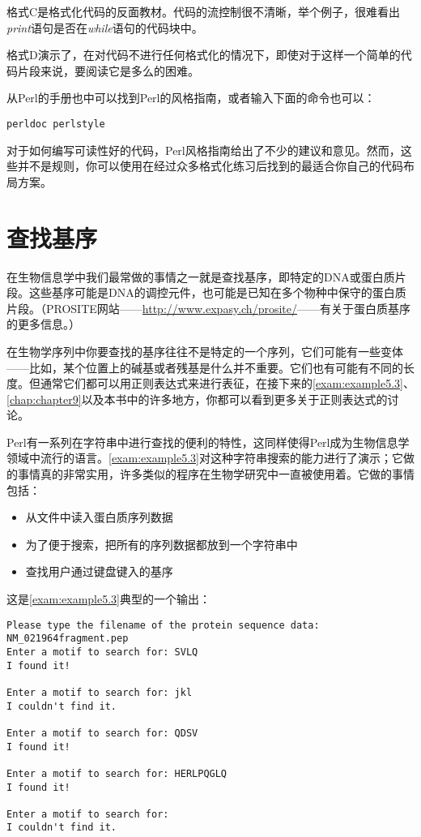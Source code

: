 格式C是格式化代码的反面教材。代码的流控制很不清晰，举个例子，很难看出\textit{print}语句是否在\textit{while}语句的代码块中。

格式D演示了，在对代码不进行任何格式化的情况下，即使对于这样一个简单的代码片段来说，要阅读它是多么的困难。

从Perl的手册也中可以找到Perl的风格指南，或者输入下面的命令也可以：

\begin{lstlisting}
perldoc perlstyle
\end{lstlisting}

对于如何编写可读性好的代码，Perl风格指南给出了不少的建议和意见。然而，这些并不是规则，你可以使用在经过众多格式化练习后找到的最适合你自己的代码布局方案。

\section{查找基序}
在生物信息学中我们最常做的事情之一就是查找基序，即特定的DNA或蛋白质片段。这些基序可能是DNA的调控元件，也可能是已知在多个物种中保守的蛋白质片段。（PROSITE网站——\href{http://www.expasy.ch/prosite/}{http://www.expasy.ch/prosite/}——有关于蛋白质基序的更多信息。）

在生物学序列中你要查找的基序往往不是特定的一个序列，它们可能有一些变体——比如，某个位置上的碱基或者残基是什么并不重要。它们也有可能有不同的长度。但通常它们都可以用正则表达式来进行表征，在接下来的\autoref{exam:example5.3}、\autoref{chap:chapter9}以及本书中的许多地方，你都可以看到更多关于正则表达式的讨论。

Perl有一系列在字符串中进行查找的便利的特性，这同样使得Perl成为生物信息学领域中流行的语言。\autoref{exam:example5.3}对这种字符串搜索的能力进行了演示；它做的事情真的非常实用，许多类似的程序在生物学研究中一直被使用着。它做的事情包括：

\begin{itemize}
  \item 从文件中读入蛋白质序列数据
  \item 为了便于搜索，把所有的序列数据都放到一个字符串中
  \item 查找用户通过键盘键入的基序
\end{itemize}



这是\autoref{exam:example5.3}典型的一个输出：

\begin{lstlisting}
Please type the filename of the protein sequence data:
NM_021964fragment.pep
Enter a motif to search for: SVLQ
I found it!

Enter a motif to search for: jkl
I couldn't find it.

Enter a motif to search for: QDSV
I found it!

Enter a motif to search for: HERLPQGLQ
I found it!

Enter a motif to search for: 
I couldn't find it. 
\end{lstlisting}


